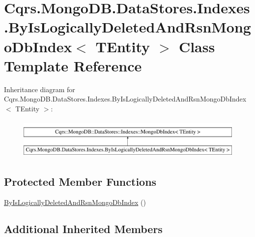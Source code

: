 \hypertarget{classCqrs_1_1MongoDB_1_1DataStores_1_1Indexes_1_1ByIsLogicallyDeletedAndRsnMongoDbIndex}{}\section{Cqrs.\+Mongo\+D\+B.\+Data\+Stores.\+Indexes.\+By\+Is\+Logically\+Deleted\+And\+Rsn\+Mongo\+Db\+Index$<$ T\+Entity $>$ Class Template Reference}
\label{classCqrs_1_1MongoDB_1_1DataStores_1_1Indexes_1_1ByIsLogicallyDeletedAndRsnMongoDbIndex}
Inheritance diagram for Cqrs.\+Mongo\+D\+B.\+Data\+Stores.\+Indexes.\+By\+Is\+Logically\+Deleted\+And\+Rsn\+Mongo\+Db\+Index$<$ T\+Entity $>$\+:\begin{figure}[H]
\begin{center}
\leavevmode
\includegraphics[height=2.000000cm]{classCqrs_1_1MongoDB_1_1DataStores_1_1Indexes_1_1ByIsLogicallyDeletedAndRsnMongoDbIndex}
\end{center}
\end{figure}
\subsection*{Protected Member Functions}
\begin{DoxyCompactItemize}
\item 
\hyperlink{classCqrs_1_1MongoDB_1_1DataStores_1_1Indexes_1_1ByIsLogicallyDeletedAndRsnMongoDbIndex_add37df2db333254d1489f13cd9a668a1}{By\+Is\+Logically\+Deleted\+And\+Rsn\+Mongo\+Db\+Index} ()
\end{DoxyCompactItemize}
\subsection*{Additional Inherited Members}


